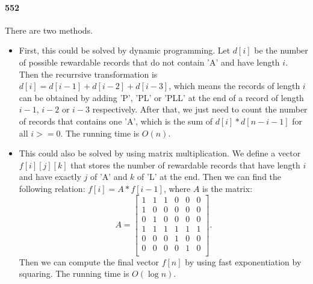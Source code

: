 \documentclass[11pt]{article}
\begin{document}
\paragraph{552}
There are two methods.
\begin{itemize}
\item First, this could be solved by dynamic programming. Let $d[i]$ be the number of possible rewardable records that do not contain 'A' and
have length $i$. Then the recurrsive transformation is $d[i] = d[i-1] + d[i-2] + d[i-3]$, which means the records of length $i$
can be obtained by adding 'P', 'PL' or 'PLL' at the end of a record of length $i-1$, $i-2$ or $i-3$ respectively.
After that, we just need to count the number of records that contains one 'A', which is the sum of $d[i] * d[n-i-1]$ for all
$i>=0$. The running time is $O(n)$. 

\item This could also be solved by using matrix multiplication. We define a vector $f[i][j][k]$ that stores the number of 
rewardable records that have length $i$ and have exactly $j$ of 'A' and $k$ of 'L' at the end. Then we can find the following
relation: $f[i] = A * f[i-1]$, where $A$ is the matrix:
\[A=\left[ 
\begin{array}{cccccc}
1 & 1 & 1 & 0 & 0 & 0 \\ 
1 & 0 & 0 & 0 & 0 & 0 \\ 
0 & 1 & 0 & 0 & 0 & 0 \\
1 & 1 & 1 & 1 & 1 & 1 \\
0 & 0 & 0 & 1 & 0 & 0 \\
0 & 0 & 0 & 0 & 1 & 0 \\
\end{array} \right]. \]
Then we can compute the final vector $f[n]$ by using fast exponentiation by squaring. The running time is $O(\log n)$.
\end{itemize}
\end{document}
